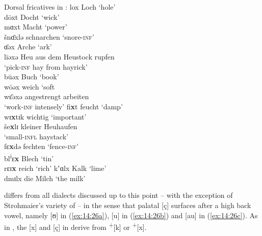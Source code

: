 \ea%
\label{ex:14:25}Dorsal fricatives in :
\ea lox  \tab  [lox] \tab Loch \tab ‘hole’ \\\label{ex:14:25a}
    dōxt \tab [doːxt] \tab Docht \tab ‘wick’ \\
    mɑxt \tab [mɑxt] \tab Macht \tab ‘power’ \\
    šn\={ɑ}xlə \tab [ʃnɑːxlə] \tab schnarchen \tab ‘snore\textsc{{}-inf}’ \\
    \={ɑ}əx \tab [ɑːəx] \tab Arche \tab ‘ark’ \\
    līəxə \tab [liːəxə] \tab Heu aus dem Heustock rupfen\\
    \tab \tab  ‘pick\textsc{{}-inf} hay from hayrick’ \\
    būəx \tab [buːəx] \tab Buch \tab ‘book’ \\
    wōəx \tab [vɔəx] \tab weich \tab ‘soft \\
    wɛ̄əxə \tab [vɛːəxə] \tab angestrengt arbeiten\\
    \tab \tab  ‘work\textsc{{}-inf} intensely’ 
\ex fi\textbf{x}t \tab [fiçt] \tab feucht \tab ‘damp’ \\\label{ex:14:25b}
    wɪ\textbf{x}tɪk \tab [vɪçtɪk] \tab wichtig \tab ‘important’ \\
    še\textbf{x}lɪ \tab [ʃeçlɪ] \tab kleiner Heuhaufen\\
    \tab \tab  ‘small-\textsc{infl} haystack’ \\
    fɛ\textbf{x}də \tab [fɛçdə] \tab fechten \tab ‘fence\textsc{{}-inf}’ \\
    bl\textsuperscript{i}ɛ\textbf{x} \tab [bliɛç] \tab Blech \tab ‘tin’ \\
    rɛɪ\textbf{x} \tab [rɛɪç] \tab reich \tab ‘rich’ 
\ex kʽɑlx \tab [kʰɑlx] \tab Kalk \tab ‘lime’ \\\label{ex:14:25c}
    dmɪlx \tab [dmɪlx] \tab die Milch \tab ‘the milk’ 
\z 
\z 

 differs from all dialects discussed up to this point -- with the exception of Strohmaier’s variety of  -- in the sense that palatal [ç] surfaces after a high back vowel, namely [ʊ] in (\ref{ex:14:26a}), [u] in (\ref{ex:14:26b}) and [au] in (\ref{ex:14:26c}). As in , the [x] and [ç] in  derive from  \textsuperscript{+}[k] or \textsuperscript{+}[x].

